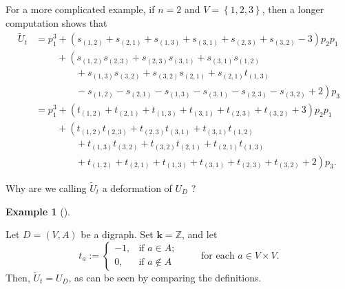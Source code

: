 \documentclass[numbers=enddot,12pt,final,onecolumn,notitlepage]{scrartcl}%
\numberwithin{exer}{section}
\theoremstyle{definition}
\newtheorem{exam}[theo]{Example}
\newenvironment{example}[1][]
{\begin{exam}[#1]\begin{leftbar}}
{\end{leftbar}\end{exam}}
\begin{document}
For a more complicated example, if $n=2$ and $V=\left\{  1,2,3\right\}  $,
then a longer computation shows that%
\begin{align*}
\widetilde{U}_{t}  &  =p_{1}^{3}+\left(  s_{\left(  1,2\right)  }+s_{\left(
2,1\right)  }+s_{\left(  1,3\right)  }+s_{\left(  3,1\right)  }+s_{\left(
2,3\right)  }+s_{\left(  3,2\right)  }-3\right)  p_{2}p_{1}\\
&  \ \ \ \ \ \ \ \ \ \ +\left(  s_{\left(  1,2\right)  }s_{\left(  2,3\right)
}+s_{\left(  2,3\right)  }s_{\left(  3,1\right)  }+s_{\left(  3,1\right)
}s_{\left(  1,2\right)  }\right. \\
&  \ \ \ \ \ \ \ \ \ \ \ \ \ \ \ \ \ \ \ \ \left.  +\ s_{\left(  1,3\right)
}s_{\left(  3,2\right)  }+s_{\left(  3,2\right)  }s_{\left(  2,1\right)
}+s_{\left(  2,1\right)  }t_{\left(  1,3\right)  }\right. \\
&  \ \ \ \ \ \ \ \ \ \ \ \ \ \ \ \ \ \ \ \ \left.  -\ s_{\left(  1,2\right)
}-s_{\left(  2,1\right)  }-s_{\left(  1,3\right)  }-s_{\left(  3,1\right)
}-s_{\left(  2,3\right)  }-s_{\left(  3,2\right)  }+2\right)  p_{3}\\
&  =p_{1}^{3}+\left(  t_{\left(  1,2\right)  }+t_{\left(  2,1\right)
}+t_{\left(  1,3\right)  }+t_{\left(  3,1\right)  }+t_{\left(  2,3\right)
}+t_{\left(  3,2\right)  }+3\right)  p_{2}p_{1}\\
&  \ \ \ \ \ \ \ \ \ \ +\left(  t_{\left(  1,2\right)  }t_{\left(  2,3\right)
}+t_{\left(  2,3\right)  }t_{\left(  3,1\right)  }+t_{\left(  3,1\right)
}t_{\left(  1,2\right)  }\right. \\
&  \ \ \ \ \ \ \ \ \ \ \ \ \ \ \ \ \ \ \ \ \left.  +\ t_{\left(  1,3\right)
}t_{\left(  3,2\right)  }+t_{\left(  3,2\right)  }t_{\left(  2,1\right)
}+t_{\left(  2,1\right)  }t_{\left(  1,3\right)  }\right. \\
&  \ \ \ \ \ \ \ \ \ \ \ \ \ \ \ \ \ \ \ \ \left.  +\ t_{\left(  1,2\right)
}+t_{\left(  2,1\right)  }+t_{\left(  1,3\right)  }+t_{\left(  3,1\right)
}+t_{\left(  2,3\right)  }+t_{\left(  3,2\right)  }+2\right)  p_{3}.
\end{align*}


Why are we calling $\widetilde{U}_{t}$ a deformation of $U_{D}$ ?

\begin{example}
Let $D=\left(  V,A\right)  $ be a digraph. Set $\mathbf{k}=\mathbb{Z}$, and
let%
\[
t_{a}:=%
\begin{cases}
-1, & \text{if }a\in A;\\
0, & \text{if }a\notin A
\end{cases}
\ \ \ \ \ \ \ \ \ \ \text{for each }a\in V\times V.
\]
Then, $\widetilde{U}_{t}=U_{D}$, as can be seen by comparing the definitions.
\end{example}
\end{document}
